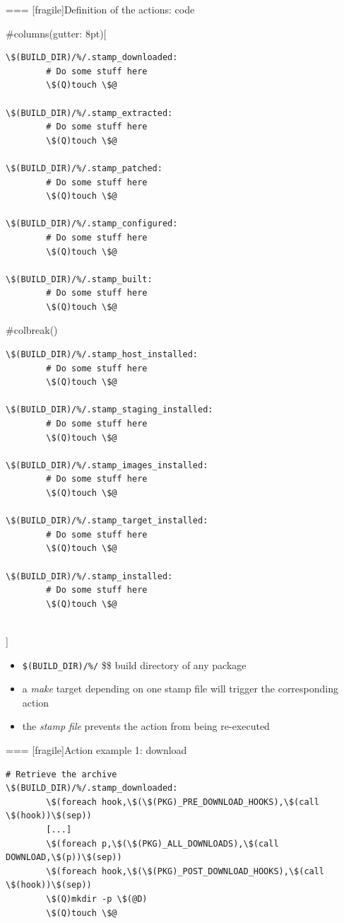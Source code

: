 === [fragile]{Definition of the actions: code}
  
#columns(gutter: 8pt)[
    \begin{block}{}
    \begin{verbatim}
\$(BUILD_DIR)/%/.stamp_downloaded:
        # Do some stuff here
        \$(Q)touch \$@

\$(BUILD_DIR)/%/.stamp_extracted:
        # Do some stuff here
        \$(Q)touch \$@

\$(BUILD_DIR)/%/.stamp_patched:
        # Do some stuff here
        \$(Q)touch \$@

\$(BUILD_DIR)/%/.stamp_configured:
        # Do some stuff here
        \$(Q)touch \$@

\$(BUILD_DIR)/%/.stamp_built:
        # Do some stuff here
        \$(Q)touch \$@
      \end{verbatim}
      \end{block}
       #colbreak()
      \begin{block}{}
      \begin{verbatim}
\$(BUILD_DIR)/%/.stamp_host_installed:
        # Do some stuff here
        \$(Q)touch \$@

\$(BUILD_DIR)/%/.stamp_staging_installed:
        # Do some stuff here
        \$(Q)touch \$@

\$(BUILD_DIR)/%/.stamp_images_installed:
        # Do some stuff here
        \$(Q)touch \$@

\$(BUILD_DIR)/%/.stamp_target_installed:
        # Do some stuff here
        \$(Q)touch \$@

\$(BUILD_DIR)/%/.stamp_installed:
        # Do some stuff here
        \$(Q)touch \$@
    \end{verbatim}
  \end{block}
 \\]

 \begin{itemize}
 \item {\tt \$(BUILD\_DIR)/\%/} \$\rightarrow\$ build directory of any package
 \item a {\em make} target depending on one stamp file will trigger
   the corresponding action
 \item the {\em stamp file} prevents the action from being re-executed
 \end{itemize}



=== [fragile]{Action example 1: download}

\begin{block}{}
\begin{verbatim}
# Retrieve the archive
\$(BUILD_DIR)/%/.stamp_downloaded:
        \$(foreach hook,\$(\$(PKG)_PRE_DOWNLOAD_HOOKS),\$(call \$(hook))\$(sep))
        [...]
        \$(foreach p,\$(\$(PKG)_ALL_DOWNLOADS),\$(call DOWNLOAD,\$(p))\$(sep))
        \$(foreach hook,\$(\$(PKG)_POST_DOWNLOAD_HOOKS),\$(call \$(hook))\$(sep))
        \$(Q)mkdir -p \$(@D)
        \$(Q)touch \$@
\end{verbatim}
\end{block}

